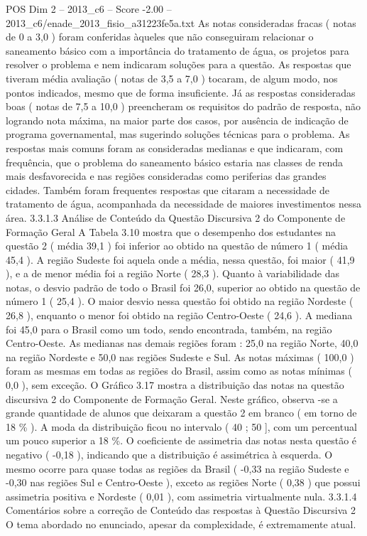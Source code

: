 \begin{textsample}{POS Dim 2 – 2013\_c6 – Score -2.00 – 2013\_c6/enade\_2013\_fisio\_a31223fe5a.txt}
As notas consideradas fracas ( notas de 0 a 3,0 ) foram conferidas àqueles que não conseguiram relacionar o saneamento básico com a importância do tratamento de água, os projetos para resolver o problema e nem indicaram soluções para a questão.
As respostas que tiveram média avaliação ( notas de 3,5 a 7,0 ) tocaram, de algum modo, nos pontos indicados, mesmo que de forma insuficiente.
Já as respostas consideradas boas ( notas de 7,5 a 10,0 ) preencheram os requisitos do padrão de resposta, não logrando nota máxima, na maior parte dos casos, por ausência de indicação de programa governamental, mas sugerindo soluções técnicas para o problema.
As respostas mais comuns foram as consideradas medianas e que indicaram, com frequência, que o problema do saneamento básico estaria nas classes de renda mais desfavorecida e nas regiões consideradas como periferias das grandes cidades.
Também foram frequentes respostas que citaram a necessidade de tratamento de água, acompanhada da necessidade de maiores investimentos nessa área. 3.3.1.3 Análise de Conteúdo da Questão Discursiva 2 do Componente de Formação Geral A Tabela 3.10 mostra que o desempenho dos estudantes na questão 2 ( média 39,1 ) foi inferior ao obtido na questão de número 1 ( média 45,4 ).
A região Sudeste foi aquela onde a média, nessa questão, foi maior ( 41,9 ), e a de menor média foi a região Norte ( 28,3 ).
Quanto à variabilidade das notas, o desvio padrão de todo o Brasil foi 26,0, superior ao obtido na questão de número 1 ( 25,4 ).
O maior desvio nessa questão foi obtido na região Nordeste ( 26,8 ), enquanto o menor foi obtido na região Centro-Oeste ( 24,6 ).
A mediana foi 45,0 para o Brasil como um todo, sendo encontrada, também, na região Centro-Oeste.
As medianas nas demais regiões foram : 25,0 na região Norte, 40,0 na região Nordeste e 50,0 nas regiões Sudeste e Sul.
As notas máximas ( 100,0 ) foram as mesmas em todas as regiões do Brasil, assim como as notas mínimas ( 0,0 ), sem exceção.
O Gráfico 3.17 mostra a distribuição das notas na questão discursiva 2 do Componente de Formação Geral.
Neste gráfico, observa -se a grande quantidade de alunos que deixaram a questão 2 em branco ( em torno de 18 \% ).
A moda da distribuição ficou no intervalo ( 40 ; 50 ], com um percentual um pouco superior a 18 \%.
O coeficiente de assimetria das notas nesta questão é negativo ( -0,18 ), indicando que a distribuição é assimétrica à esquerda.
O mesmo ocorre para quase todas as regiões da Brasil ( -0,33 na região Sudeste e -0,30 nas regiões Sul e Centro-Oeste ), exceto as regiões Norte ( 0,38 ) que possui assimetria positiva e Nordeste ( 0,01 ), com assimetria virtualmente nula. 3.3.1.4 Comentários sobre a correção de Conteúdo das respostas à Questão Discursiva 2 O tema abordado no enunciado, apesar da complexidade, é extremamente atual.

\end{textsample}
